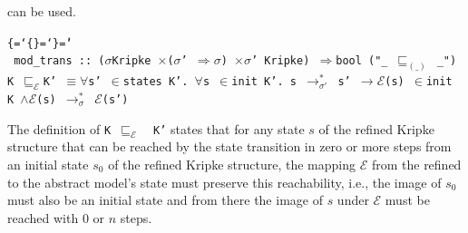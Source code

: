 \documentclass{llncs}
\newenvironment{ttbox}{\begin{alltt}\ttbraces\small\tt}%
                      {\end{alltt}}
\def\ttbraces{\let\.=\nobreak\chardef\{=`\{\chardef\}=`\}\chardef\|=`\\}
\newcommand\ttand{\mbox{{$\land$}}}
\newcommand\ttfun{\mbox{{$\Rightarrow$}}}
\newcommand\ttimp{\mbox{{$\longrightarrow$}}}
\newcommand\ttequiv{\mbox{{$\equiv$}}}
\newcommand\ttforall{\mbox{{$\forall$}}}
\newcommand\ttin{\mbox{{$\in$}}}
\newcommand\tttimes{\mbox{\( \times \)}}
\newcommand\ttrelstar[1]{\mbox{{$\to_{#1}^*$}}}
\newcommand\ttsigma{\mbox{{$\sigma$}}}
\newcommand\ttmref[1]{\mbox{{$\sqsubseteq_{#1}$}}}
\newcommand\ttmeref{\ttmref{\mathcal{E}}}
\newcommand\ttecal{\mbox{$\mathcal{E}$}}
\begin{document}
can be used.
\begin{ttbox}
 mod_trans ::  (\ttsigma Kripke \tttimes (\ttsigma' \ttfun \ttsigma) \tttimes \ttsigma' Kripke) 
               \ttfun bool                  ("_ \ttmref{(\_)} _")
  K \ttmeref K' \ttequiv \ttforall s' \ttin states K'. \ttforall s \ttin init K'. 
             s \ttrelstar{\sigma'} s' \ttimp \ttecal(s) \ttin init K 
             \ttand \ttecal(s) \ttrelstar{\sigma} \ttecal(s')
\end{ttbox}
The definition of \texttt{K \ttmeref\, K'} states that for any state $s$ 
of the refined Kripke structure that can be reached by the state transition
in zero or more steps from an initial state $s_0$ of the refined Kripke 
structure, the mapping ${\mathcal E}$ from the refined to the abstract 
model's state must preserve this reachability, i.e., the image of
$s_0$ must also be an initial state and from there the image of $s$
under ${\mathcal E}$ must be reached with $0$ or $n$ steps.
\end{document}
